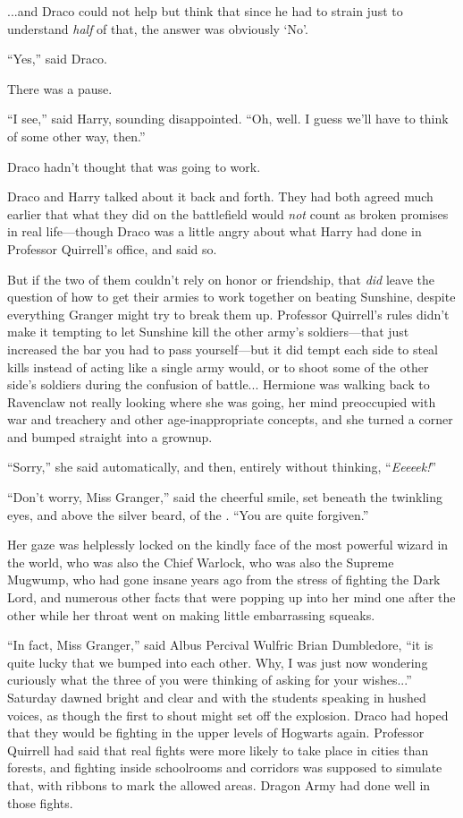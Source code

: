 ...and Draco could not help but think that since he had to strain just to understand \emph{half} of that, the answer was obviously ‘No’.

“Yes,” said Draco.

There was a pause.

“I see,” said Harry, sounding disappointed. “Oh, well. I guess we’ll have to think of some other way, then.”

Draco hadn’t thought that was going to work.

Draco and Harry talked about it back and forth. They had both agreed much earlier that what they did on the battlefield would \emph{not} count as broken promises in real life—though Draco was a little angry about what Harry had done in Professor Quirrell’s office, and said so.

But if the two of them couldn’t rely on honor or friendship, that \emph{did} leave the question of how to get their armies to work together on beating Sunshine, despite everything Granger might try to break them up. Professor Quirrell’s rules didn’t make it tempting to let Sunshine kill the other army’s soldiers—that just increased the bar you had to pass yourself—but it did tempt each side to steal kills instead of acting like a single army would, or to shoot some of the other side’s soldiers during the confusion of battle...
\sbreak
Hermione was walking back to Ravenclaw not really looking where she was going, her mind preoccupied with war and treachery and other age-inappropriate concepts, and she turned a corner and bumped straight into a grownup.

“Sorry,” she said automatically, and then, entirely without thinking, “\emph{Eeeeek!}”

“Don’t worry, Miss Granger,” said the cheerful smile, set beneath the twinkling eyes, and above the silver beard, of the . “You are quite forgiven.”

Her gaze was helplessly locked on the kindly face of the most powerful wizard in the world, who was also the Chief Warlock, who was also the Supreme Mugwump, who had gone insane years ago from the stress of fighting the Dark Lord, and numerous other facts that were popping up into her mind one after the other while her throat went on making little embarrassing squeaks.

“In fact, Miss Granger,” said Albus Percival Wulfric Brian Dumbledore, “it is quite lucky that we bumped into each other. Why, I was just now wondering curiously what the three of you were thinking of asking for your wishes...”
\sbreak
Saturday dawned bright and clear and with the students speaking in hushed voices, as though the first to shout might set off the explosion.
\sbreak
Draco had hoped that they would be fighting in the upper levels of Hogwarts again. Professor Quirrell had said that real fights were more likely to take place in cities than forests, and fighting inside schoolrooms and corridors was supposed to simulate that, with ribbons to mark the allowed areas. Dragon Army had done well in those fights.


